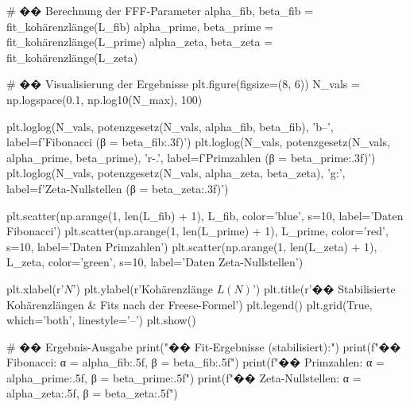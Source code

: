 # �� Berechnung der FFF-Parameter
alpha_fib, beta_fib = fit_kohärenzlänge(L_fib)
alpha_prime, beta_prime = fit_kohärenzlänge(L_prime)
alpha_zeta, beta_zeta = fit_kohärenzlänge(L_zeta)

# �� Visualisierung der Ergebnisse
plt.figure(figsize=(8, 6))
N_vals = np.logspace(0.1, np.log10(N_max), 100)

plt.loglog(N_vals, potenzgesetz(N_vals, alpha_fib, beta_fib), 'b--', label=f'Fibonacci (β = {beta_fib:.3f})')
plt.loglog(N_vals, potenzgesetz(N_vals, alpha_prime, beta_prime), 'r-.', label=f'Primzahlen (β = {beta_prime:.3f})')
plt.loglog(N_vals, potenzgesetz(N_vals, alpha_zeta, beta_zeta), 'g:', label=f'Zeta-Nullstellen (β = {beta_zeta:.3f})')

plt.scatter(np.arange(1, len(L_fib) + 1), L_fib, color='blue', s=10, label='Daten Fibonacci')
plt.scatter(np.arange(1, len(L_prime) + 1), L_prime, color='red', s=10, label='Daten Primzahlen')
plt.scatter(np.arange(1, len(L_zeta) + 1), L_zeta, color='green', s=10, label='Daten Zeta-Nullstellen')

plt.xlabel(r'$N$')
plt.ylabel(r'Kohärenzlänge $L(N)$')
plt.title(r'�� Stabilisierte Kohärenzlängen \& Fits nach der Freese-Formel')
plt.legend()
plt.grid(True, which='both', linestyle='--')
plt.show()

# �� Ergebnis-Ausgabe
print("\n�� Fit-Ergebnisse (stabilisiert):")
print(f"�� Fibonacci: α = {alpha_fib:.5f}, β = {beta_fib:.5f}")
print(f"�� Primzahlen: α = {alpha_prime:.5f}, β = {beta_prime:.5f}")
print(f"�� Zeta-Nullstellen: α = {alpha_zeta:.5f}, β = {beta_zeta:.5f}")